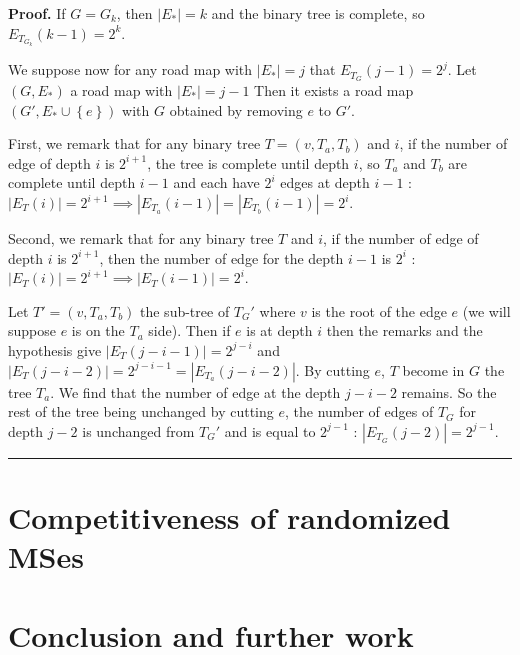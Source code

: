 \documentclass[11pt,letterpaper]{article}
\newenvironment{proof}[1][Proof]{\textbf{#1.} }{\ \rule{0.5em}{0.5em}}
\newcommand{\kctp}{$k$-CTP}
\newcommand{\set}[1]{\left\{ #1 \right\}}
\newcommand{\card}[1]{\left| #1 \right|}
\newcommand{\mts}{MS}
\begin{document}
\begin{proof}
If $G = G_k$, then $\card{E_*} = k$ and the binary tree is complete, so $E_{T_{G_k}}(k-1) = 2^k$.

We suppose now for any road map with $\card{E_*} = j$ that $E_{T_G}(j-1) = 2^j$. Let $(G, E_*)$ a road map with $\card{E_*} = j-1$ Then it exists a road map $(G', E_* \cup \set{e})$ with $G$ obtained by removing $e$ to $G'$.

First, we remark that for any binary tree $T = (v, T_a, T_b)$ and $i$, if the number of edge of depth $i$ is $2^{i+1}$, the tree is complete until depth $i$, so $T_a$ and $T_b$ are complete until depth $i-1$ and each have $2^i$ edges at depth $i-1$ : $\card{E_T(i)} = 2^{i+1} \implies \card{E_{T_a}(i-1)} = \card{E_{T_b}(i-1)} = 2^i$.
 
Second, we remark that for any binary tree $T$ and $i$, if the number of edge of depth $i$ is $2^{i+1}$, then the number of edge for the depth $i-1$ is $2^i$ : $\card{E_T(i)} = 2^{i+1} \implies \card{E_T(i-1)} = 2^i$.

Let $T' = (v, T_a, T_b)$ the sub-tree of $T_G'$ where $v$ is the root of the edge $e$ (we will suppose $e$ is on the $T_a$ side). Then if $e$ is at depth $i$ then the remarks and the hypothesis give $\card{E_{T}(j-i-1)} = 2^{j-i}$ and $\card{E_{T}(j-i-2)} = 2^{j-i-1} = \card{E_{T_a}(j-i-2)}$. By cutting $e$, $T$ become in $G$ the tree $T_a$. We find that the number of edge at the depth $j-i-2$ remains. So the rest of the tree being unchanged by cutting $e$, the number of edges of $T_G$ for depth $j-2$ is unchanged from $T_G'$ and is equal to $2^{j-1}$ : $\card{E_{T_G}(j-2)} = 2^{j-1}$.
\end{proof}

\section{Competitiveness of randomized \mts es} \label{sec:competitiveness}

\section{Conclusion and further work} \label{sec:conclusion}

\end{document}
